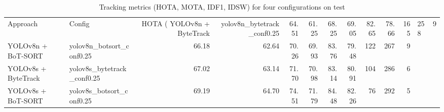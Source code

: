 \begin{table}
\caption{Tracking metrics (HOTA, MOTA, IDF1, IDSW) for four configurations on test}
\label{tab:tracking_metrics_test}
\begin{tabular}{llrrrrrrrrr}
\toprule
Approach & Config & HOTA (%
\midrule
YOLOv8n + ByteTrack & yolov8n_bytetrack_conf0.25 & 64.51 & 61.25 & 68.25 & 69.05 & 82.65 & 78.66 & 165 & 258 & 9 \\
YOLOv8n + BoT-SORT & yolov8n_botsort_conf0.25 & 66.18 & 62.64 & 70.26 & 69.93 & 83.76 & 79.48 & 122 & 267 & 9 \\
YOLOv8s + ByteTrack & yolov8s_bytetrack_conf0.25 & 67.02 & 63.14 & 71.70 & 70.98 & 83.14 & 80.91 & 104 & 286 & 6 \\
YOLOv8s + BoT-SORT & yolov8s_botsort_conf0.25 & 69.19 & 64.70 & 74.51 & 71.79 & 84.48 & 82.26 & 76 & 292 & 5 \\
\bottomrule
\end{tabular}
\end{table}
